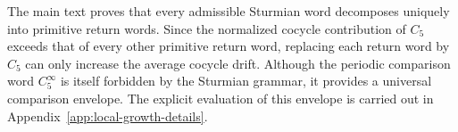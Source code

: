 \documentclass[12pt, oneside]{article}
\numberwithin{equation}{section}
\theoremstyle{definition}
\newtheorem{proposition}{Proposition}[section]
\theoremstyle{plain}
\theoremstyle{remark}
\begin{document}






The main text proves that every admissible Sturmian word decomposes uniquely
into primitive return words. Since the normalized cocycle contribution of \(C_5\)
exceeds that of every other primitive return word, replacing each return word by \(C_5\)
can only increase the average cocycle drift. Although the periodic comparison word
\(C_5^\infty\) is itself forbidden by the Sturmian grammar, it provides a universal
comparison envelope. The explicit evaluation of this envelope is carried out in 
Appendix~\ref{app:local-growth-details}.
\end{document}
